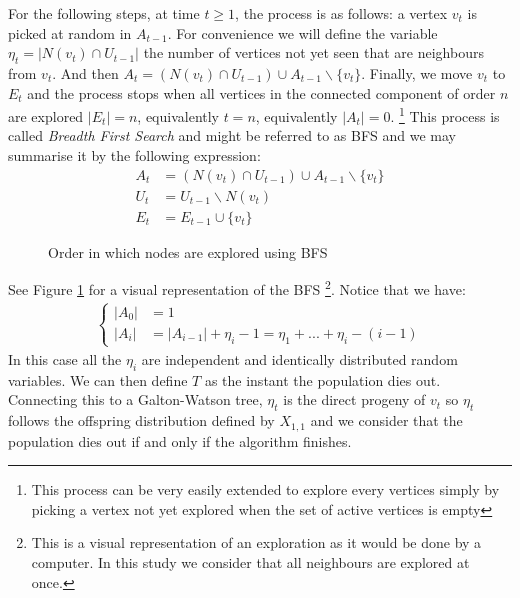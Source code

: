 \newline
For the following steps, at time $t \geq 1$, the process is as follows: a vertex $v_t$ is picked at random in $A_{t-1}$. 
For convenience we will define the variable $\eta_t = |N(v_t) \cap U_{t-1}|$ the number of vertices not yet seen that are neighbours from $v_t$.
And then $A_t = (N(v_t)\cap U_{t-1} ) \cup A_{t-1} \backslash \{v_t\}$.
Finally, we move $v_t$ to $E_t$ and the process stops when all vertices in the connected component of order $n$ are explored $|E_t| = n$, equivalently $t=n$, equivalently $|A_t| = 0$.
\footnote{This process can be very easily extended to explore every vertices simply by picking a vertex not yet explored when the set of active vertices is empty}
\newline
This process is called \emph{Breadth First Search} and might be referred to as BFS and we may summarise it by the following expression:
\begin{align}
    A_t &= (N(v_t) \cap U_{t-1})\cup A_{t-1} \backslash \{v_t\} \\
    U_t &= U_{t-1}\backslash N(v_t)  \\
    E_t &= E_{t-1}\cup \{v_t\}
\end{align}
\begin{figure}
    \centering
    \caption{Order in which nodes are explored using BFS}
    \label{fig:BFS}
\end{figure}
See Figure \ref{fig:BFS} for a visual representation of the BFS \footnote{This is a visual representation of an exploration as it would be done by a computer. In this study we consider that all neighbours are explored at once.}.
Notice that we have:
\begin{align}\label{activatedV}
	\left\{\begin{array}{rl}
			|A_0| &= 1\\
			|A_i| &= |A_{i-1}| + \eta_i - 1 = \eta_1 + ... + \eta_i - ( i - 1)
	 \end{array}
	\right.
\end{align}
In this case all the $\eta_i$ are independent and identically distributed random variables.
We can then define $T$ as the instant the population dies out.
Connecting this to a Galton-Watson tree, $\eta_t$ is the direct progeny of $v_t$ so $\eta_t$ follows the offspring distribution defined by $X_{1, 1}$ and we consider that the population dies out if and only if the algorithm finishes.
